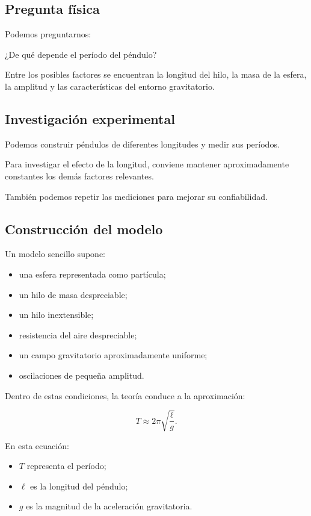 \subsection{Pregunta física}

Podemos preguntarnos:

\begin{center}
¿De qué depende el período del péndulo?
\end{center}

Entre los posibles factores se encuentran
la longitud del hilo, la masa de la esfera,
la amplitud y las características
del entorno gravitatorio.

\subsection{Investigación experimental}

Podemos construir péndulos de diferentes
longitudes y medir sus períodos.

Para investigar el efecto de la longitud,
conviene mantener aproximadamente constantes
los demás factores relevantes.

También podemos repetir las mediciones
para mejorar su confiabilidad.

\subsection{Construcción del modelo}

Un modelo sencillo supone:

\begin{itemize}
    \item una esfera representada como partícula;
    \item un hilo de masa despreciable;
    \item un hilo inextensible;
    \item resistencia del aire despreciable;
    \item un campo gravitatorio aproximadamente uniforme;
    \item oscilaciones de pequeña amplitud.
\end{itemize}

Dentro de estas condiciones,
la teoría conduce a la aproximación:

\[T\approx2\pi\sqrt{\frac{\ell}{g}}.\]

En esta ecuación:

\begin{itemize}
    \item \(T\) representa el período;
    \item \(\ell\) es la longitud del péndulo;
    \item \(g\) es la magnitud de la aceleración gravitatoria.
\end{itemize}

